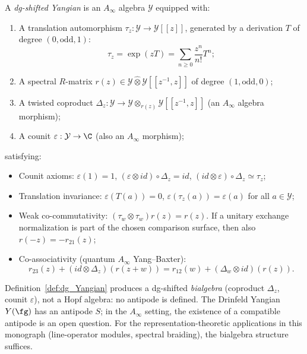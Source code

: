 \begin{definition}
\label{def:dg_Yangian}
A \emph{dg-shifted Yangian} is an $A_\infty$ algebra $\mathcal{Y}$ equipped with:
\begin{enumerate}[label=(\roman*)]
\item A translation automorphism $\tau_z : \mathcal{Y} \to \mathcal{Y}[[z]]$, generated by a derivation $T$ of degree $(0, \text{odd}, 1)$:
\begin{equation}
\tau_z = \exp(z T) = \sum_{n \geq 0} \frac{z^n}{n!} T^n;
\end{equation}

\item A spectral $R$-matrix $r(z) \in \mathcal{Y} \widehat{\otimes} \mathcal{Y}[[z^{-1}, z]]$ of degree $(1, \text{odd}, 0)$;

\item A twisted coproduct $\Delta_z : \mathcal{Y} \to \mathcal{Y} \otimes_{r(z)} \mathcal{Y}[[z^{-1}, z]]$ (an $A_\infty$ algebra morphism);
\item A counit $\varepsilon : \mathcal{Y} \to \C$ (also an $A_\infty$ morphism);
\end{enumerate}
satisfying:
\begin{itemize}
\item Counit axioms: $\varepsilon(1) = 1$, $(\varepsilon \otimes id) \circ \Delta_z = id$, $(id \otimes \varepsilon) \circ \Delta_z \simeq \tau_z$;
\item Translation invariance: $\varepsilon(T(a)) = 0$, $\varepsilon(\tau_z(a)) = \varepsilon(a)$ for all $a \in \mathcal{Y}$;
\item Weak co-commutativity: $(\tau_w \otimes \tau_w) r(z) = r(z)$.
If a unitary exchange normalization is part of the chosen comparison
surface, then also $r(-z) = -r_{21}(z)$;
\item Co-associativity (quantum $A_\infty$ Yang--Baxter):
\begin{equation}
r_{23}(z) + (id \otimes \Delta_z)(r(z+w)) = r_{12}(w) + (\Delta_w \otimes id)(r(z)).
\end{equation}
\end{itemize}
\end{definition}

\begin{remark}
\label{rem:dg-yangian-antipode}
Definition~\ref{def:dg_Yangian} produces a dg-shifted \emph{bialgebra} (coproduct $\Delta_z$, counit $\varepsilon$), not a Hopf algebra: no antipode is defined. The Drinfeld Yangian $Y(\fg)$ has an antipode $S$; in the $A_\infty$ setting, the existence of a compatible antipode is an open question. For the representation-theoretic applications in this monograph (line-operator modules, spectral braiding), the bialgebra structure suffices.
\end{remark}

